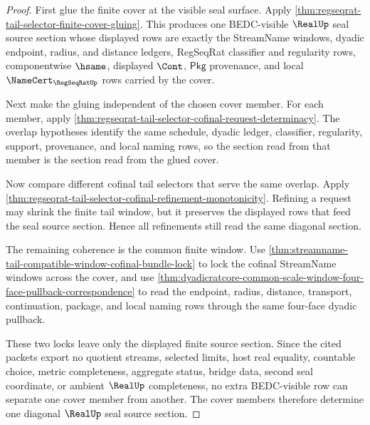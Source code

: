 \begin{proof}
First glue the finite cover at the visible seal surface. Apply
\autoref{thm:regseqrat-tail-selector-finite-cover-gluing}. This produces one
BEDC-visible $\RealUp$ seal source section whose displayed rows are exactly
the StreamName windows, dyadic endpoint, radius, and distance ledgers,
RegSeqRat classifier and regularity rows, componentwise $\hsame$, displayed
$\Cont$, $\mathsf{Pkg}$ provenance, and local
$\NameCert_{\RegSeqRatUp}$ rows carried by the cover.

Next make the gluing independent of the chosen cover member. For each member,
apply \autoref{thm:regseqrat-tail-selector-cofinal-request-determinacy}. The
overlap hypotheses identify the same schedule, dyadic ledger, classifier,
regularity, support, provenance, and local naming rows, so the section read
from that member is the section read from the glued cover.

Now compare different cofinal tail selectors that serve the same overlap.
Apply \autoref{thm:regseqrat-tail-selector-cofinal-refinement-monotonicity}.
Refining a request may shrink the finite tail window, but it preserves the
displayed rows that feed the seal source section. Hence all refinements still
read the same diagonal section.

The remaining coherence is the common finite window. Use
\autoref{thm:streamname-tail-compatible-window-cofinal-bundle-lock} to lock
the cofinal StreamName windows across the cover, and use
\autoref{thm:dyadicratcore-common-scale-window-four-face-pullback-correspondence}
to read the endpoint, radius, distance, transport, continuation, package, and
local naming rows through the same four-face dyadic pullback.

These two locks leave only the displayed finite source section. Since the
cited packets export no quotient streams, selected limits, host real equality,
countable choice, metric completeness, aggregate status, bridge data, second
seal coordinate, or ambient $\RealUp$ completeness, no extra BEDC-visible row
can separate one cover member from another. The cover members therefore
determine one diagonal $\RealUp$ seal source section.
\end{proof}
